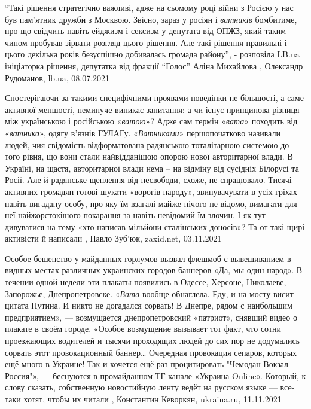 \enquote{Такі рішення стратегічно важливі, адже на сьомому році війни з Росією у нас
був пам'ятник дружби з Москвою. Звісно, зараз у росіян і \emph{ватників} бомбитиме,
про що свідчить навіть ейджизм і сексизм у депутата від ОПЖЗ, який таким чином
пробував зірвати розгляд цього рішення. Але такі рішення правильні і цього
декілька років безуспішно добивалась громада району}, - розповіла LB.ua
ініціаторка рішення, депутатка від фракції \enquote{Голос} Аліна Михайлова
, 
Олександр Рудоманов, lb.ua, 08.07.2021

Спостерігаючи за такими специфічними проявами поведінки не більшості, а саме
активної меншості, неминуче виникає запитання: а чи існує принципова різниця
між українською і російською «\emph{ватою}»? Адже сам термін «\emph{вата}» походить від
«\emph{ватника}», одягу в'язнів ГУЛАГу. «\emph{Ватниками}» першопочатково називали людей, чия
свідомість відформатована радянською тоталітарною системою до того рівня, що
вони стали найвідданішою опорою нової авторитарної влади. В Україні, на щастя,
авторитарної влади нема – на відміну від сусідніх Білорусі та Росії. Але й
радянське щеплення від несвободи, схоже, не спрацювало. Тисячі активних
громадян готові шукати «ворогів народу», звинувачувати в усіх гріхах навіть
вигадану особу, про яку їм взагалі майже нічого не відомо, вимагати для неї
найжорстокішого покарання за навіть невідомий їм злочин. І як тут дивуватися на
тему «хто написав мільйони сталінських доносів»? Та от такі щирі активісти й
написали
, Павло Зуб'юк, zaxid.net, 03.11.2021

Особое бешенство у майданных горлумов вызвал флешмоб с вывешиванием в видных
местах различных украинских городов баннеров «Да, мы один народ». В течении
одной недели эти плакаты появились в Одессе, Херсоне, Николаеве, Запорожье,
Днепропетровске.  «\emph{Вата} вообще обнаглела. Еду, и на мосту висит цитата
Путина. И никто не догадался сорвать! В Днепре, рядом с наибольшим
предприятием», — возмущается днепропетровский «патриот», снявший видео о
плакате в своём городе. «Особое возмущение вызывает тот факт, что сотни
проезжающих водителей и тысячи проходящих людей до сих пор не додумались
сорвать этот провокационный баннер… Очередная провокация сепаров, которых ещё
много в Украине! Так и хочется ещё раз процитировать "Чемодан-Вокзал-Россия"»,
— беснуются в промайданном ТГ-канале «Украина Online». Который, к слову
сказать, собственную новостийную ленту ведёт на русском языке — все-таки хотят,
чтобы их читали
, 
Константин Кеворкян, ukraina.ru, 11.11.2021
